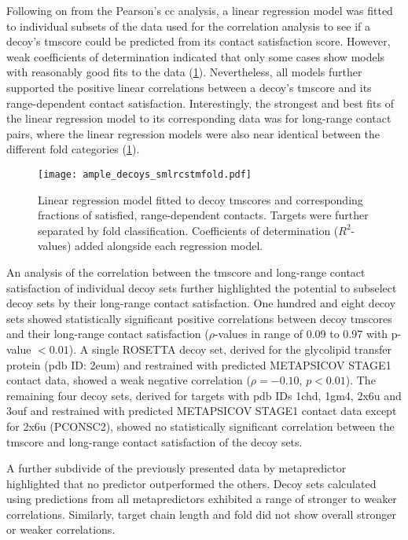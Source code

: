 Following on from the Pearson's \gls{cc} analysis, a linear regression model was fitted to individual subsets of the data used for the correlation analysis to see if a decoy's \gls{tmscore} could be predicted from its contact satisfaction score. However, weak coefficients of determination indicated that only some cases show models with reasonably good fits to the data (\cref{fig:ample_decoys_smlrcstmfold}). Nevertheless, all models further supported the positive linear correlations between a decoy's \gls{tmscore} and its range-dependent contact satisfaction. Interestingly, the strongest and best fits of the linear regression model to its corresponding data was for long-range contact pairs, where the linear regression models were also near identical between the different fold categories (\cref{fig:ample_decoys_smlrcstmfold}).

\begin{figure}[H]
	\centering
	\texttt{[image: ample\_decoys\_smlrcstmfold.pdf]}
        \caption[Regression model between decoy TM-score and contact satisfaction]{Linear regression model fitted to decoy \gls{tmscore}s and corresponding fractions of satisfied, range-dependent contacts. Targets were further separated by fold classification. Coefficients of determination ($R^2$-values) added alongside each regression model.}
	\label{fig:ample_decoys_smlrcstmfold}
\end{figure}

An analysis of the correlation between the \gls{tmscore} and long-range contact satisfaction of individual decoy sets further highlighted the potential to subselect decoy sets by their long-range contact satisfaction. One hundred and eight decoy sets showed statistically significant positive correlations between decoy \gls{tmscore}s and their long-range contact satisfaction ($\rho$-values in range of 0.09 to 0.97 with p-value $<0.01$). A single ROSETTA decoy set, derived for the glycolipid transfer protein (\gls{pdb} ID: 2eum) and restrained with predicted METAPSICOV STAGE1 contact data, showed a weak negative correlation ($\rho=-0.10$, $p<0.01$). The remaining four decoy sets, derived for targets with \gls{pdb} IDs 1chd, 1gm4, 2x6u and 3ouf and restrained with predicted METAPSICOV STAGE1 contact data except for 2x6u (PCONSC2), showed no statistically significant correlation between the \gls{tmscore} and long-range contact satisfaction of the decoy sets. 

A further subdivide of the previously presented data by metapredictor highlighted that no predictor outperformed the others. Decoy sets calculated using predictions from all metapredictors exhibited a range of stronger to weaker correlations. Similarly, target chain length and fold did not show overall stronger or weaker correlations. 

